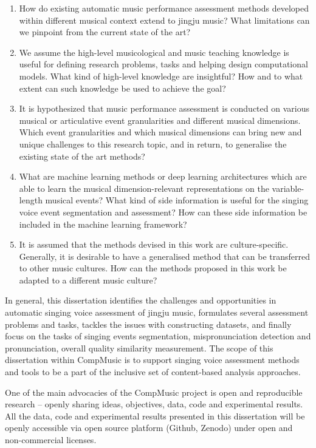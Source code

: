 \begin{enumerate}[leftmargin=*]
\item How do existing automatic music performance assessment methods developed within different musical context extend to jingju music? What limitations can we pinpoint from the current state of the art?
\item We assume the high-level musicological and music teaching knowledge is useful for defining research problems, tasks and helping design computational models. What kind of high-level knowledge are insightful? How and to what extent can such knowledge be used to achieve the goal?
\item It is hypothesized that music performance assessment is conducted on various musical or articulative event granularities and different musical dimensions. Which event granularities and which musical dimensions can bring new and unique challenges to this research topic, and in return, to generalise the existing state of the art methods?
\item What are machine learning methods or deep learning architectures which are able to learn the musical dimension-relevant representations on the variable-length musical events? What kind of side information is useful for the singing voice event segmentation and assessment? How can these side information be included in the machine learning framework?
\item It is assumed that the methods devised in this work are culture-specific. Generally, it is desirable to have a generalised method that can be transferred to other music cultures. How can the methods proposed in this work be adapted to a different music culture? 
\end{enumerate}

In general, this dissertation identifies the challenges and opportunities in automatic singing voice assessment of jingju music, formulates several assessment problems and tasks, tackles the issues with constructing datasets, and finally focus on the tasks of singing events segmentation, mispronunciation detection and pronunciation, overall quality similarity measurement. The scope of this dissertation within CompMusic is to support singing voice assessment methods and tools to be a part of the inclusive set of content-based analysis approaches.

One of the main advocacies of the CompMusic project is open and reproducible research -- openly sharing ideas, objectives, data, code and experimental results. All the data, code and experimental results presented in this dissertation will be openly accessible via open source platform (Github, Zenodo) under open and non-commercial licenses.

